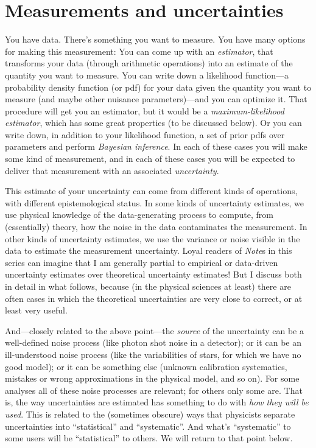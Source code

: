\documentclass[10pt]{article}
\newcommand{\documentname}{\textsl{Note}}
\begin{document}
\section{Measurements and uncertainties}

You have data. There's something you want to measure. You have many
options for making this measurement: You can come up with an
\textsl{estimator}, that transforms your data (through arithmetic
operations) into an estimate of the quantity you want to measure. You
can write down a likelihood function---a probability density function
(or pdf) for your data given the quantity you want to measure (and
maybe other nuisance parameters)---and you can optimize it. That
procedure will get you an estimator, but it would be a
\textsl{maximum-likelihood estimator}, which has some great
properties (to be discussed below).
Or you can write down, in addition to your likelihood
function, a set of prior pdfs over parameters and perform
\textsl{Bayesian inference}.  In each of these cases you will make
some kind of measurement, and in each of these cases you will be
expected to deliver that measurement with an associated \textsl{uncertainty}.

This estimate of your uncertainty can come from different kinds of operations, with
different epistemological status. In some kinds of uncertainty
estimates, we use physical knowledge of the data-generating process to
compute, from (essentially) theory, how the noise in the data
contaminates the measurement. In other kinds of uncertainty estimates,
we use the variance or noise visible in the data to estimate the measurement
uncertainty. Loyal readers of \documentname s in this series can imagine that
I am generally partial to empirical or data-driven uncertainty estimates over
theoretical uncertainty estimates! But I discuss both in detail in what follows,
because (in the physical sciences at least) there are often cases in which the
theoretical uncertainties are very close to correct, or at least very useful.

And---closely related to the above point---the \emph{source} of the
uncertainty can be a well-defined noise process (like photon shot
noise in a detector); or it can be an ill-understood noise process
(like the variabilities of stars, for which we have no good model); or
it can be something else (unknown calibration systematics, mistakes or
wrong approximations in the physical model, and so on). For some analyses
all of these noise processes are relevant; for others only some are.
That is, the way uncertainties are estimated has something to do with
\emph{how they will be used}. This is related to the (sometimes obscure)
ways that physicists separate uncertainties into ``statistical'' and ``systematic''.
And what's ``systematic'' to some users will be ``statistical'' to others.
We will return to that point below.
\end{document}
